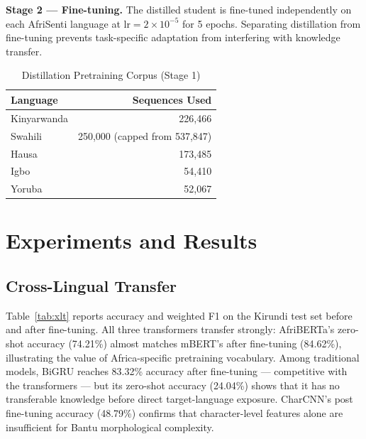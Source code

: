 \documentclass[conference]{IEEEtran}
\begin{document}
\textbf{Stage 2 --- Fine-tuning.} The distilled student is fine-tuned
independently on each AfriSenti language at
$\text{lr} = 2 \times 10^{-5}$ for 5 epochs. Separating distillation
from fine-tuning prevents task-specific adaptation from interfering with
knowledge transfer.

\begin{table}[htbp]
\caption{Distillation Pretraining Corpus (Stage 1)}
\label{tab:corpus}
\begin{center}
\begin{tabular}{lr}
\toprule
\textbf{Language} & \textbf{Sequences Used} \\
\midrule
Kinyarwanda & 226,466 \\
Swahili     & 250,000 (capped from 537,847) \\
Hausa       & 173,485 \\
Igbo        &  54,410 \\
Yoruba      &  52,067 \\
\bottomrule
\end{tabular}
\end{center}
\end{table}

\section{Experiments and Results}\label{sec:results}

\subsection{Cross-Lingual Transfer}\label{sec:res_xlt}

Table~\ref{tab:xlt} reports accuracy and weighted F1 on the Kirundi test
set before and after fine-tuning. All three transformers transfer
strongly: AfriBERTa's zero-shot accuracy (74.21\%) almost matches
mBERT's after fine-tuning (84.62\%), illustrating the value of
Africa-specific pretraining vocabulary. Among traditional models, BiGRU
reaches 83.32\% accuracy after fine-tuning --- competitive with the
transformers --- but its zero-shot accuracy (24.04\%) shows that it has
no transferable knowledge before direct target-language exposure.
CharCNN's post fine-tuning accuracy (48.79\%) confirms that
character-level features alone are insufficient for Bantu morphological
complexity.
\end{document}
